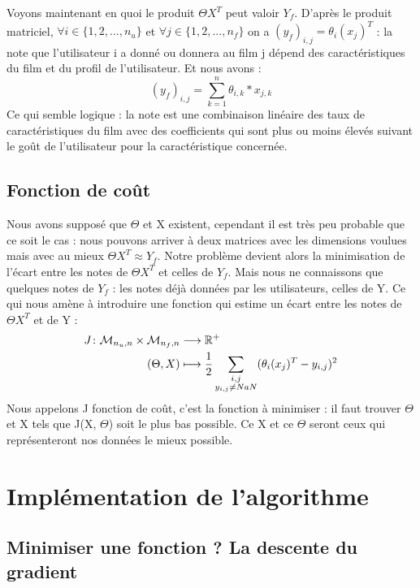 \documentclass[a4paper,10pt]{article}
\begin{document}
Voyons maintenant en quoi le produit $\Theta X^T$ peut valoir $Y_f$. D'après le produit matriciel, $\forall i \in \{1, 2, ..., n_u\}$ et $\forall j \in \{1, 2, ..., n_f\}$ on a $(y_{f})_{i,j} = \theta_{i}(x_{j})^{T}$ : la note que l'utilisateur i a donné ou donnera au film j dépend des caractéristiques du film et du profil de l'utilisateur. Et nous avons :
\[(y_{f})_{i,j} = \sum_{k = 1}^{n} \theta_{i,k} * x_{j,k}\]
Ce qui semble logique : la note est une combinaison linéaire des taux de caractéristiques du film avec des coefficients qui sont plus ou moins élevés suivant le goût de l'utilisateur pour la caractéristique concernée.

\subsection{Fonction de coût}

Nous avons supposé que $\Theta$ et X existent, cependant il est très peu probable que ce soit le cas : nous pouvons arriver à deux matrices avec les dimensions voulues mais avec au mieux $\Theta X^T \approx Y_f$. Notre problème devient alors la minimisation de l'écart entre les notes de $\Theta X^T$ et celles de $Y_f$. Mais nous ne connaissons que quelques notes de $Y_f$ : les notes déjà données par les utilisateurs, celles de Y. Ce qui nous amène à introduire une fonction qui estime un écart entre les notes de $\Theta X^T$ et de Y :
\begin{align*}
J\colon{\cal M}_{n_u, n} \times {\cal M}_{n_f, n} &\longrightarrow \mathbb{R}^+\\
(\Theta, X)&\longmapsto \frac{1}{2}\sum_{\substack{i,j \\ y_{i,j} \ne NaN}}(\theta_{i}(x_{j})^{T}-y_{i,j})^{2}
\end{align*}
Nous appelons J fonction de coût, c'est la fonction à minimiser : il faut trouver $\Theta$ et X tels que J(X, $\Theta$) soit le plus bas possible. Ce X et ce $\Theta$ seront ceux qui représenteront nos données le mieux possible.

\section{Implémentation de l'algorithme}
\subsection{Minimiser une fonction ? La descente du gradient}
\end{document}

